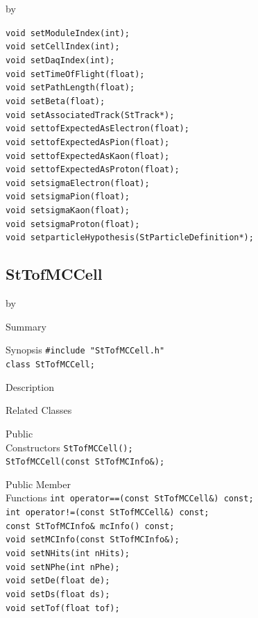 \documentclass[twoside]{article}
\newcommand{\entrylabel}[1]{\mbox{\textbf{{#1}}}\hfil}%
\newenvironment{entry}
{\begin{list}{}%
    {\renewcommand{\makelabel}{\entrylabel}%
     \setlength{\labelwidth}{90pt}%
     \setlength{\leftmargin}{\labelwidth}
     \advance\leftmargin by \labelsep%
      }%
    }%
  {\end{list}}
\newcommand{\Entrylabel}[1]%
{\raisebox{0pt}[1ex][0pt]{\makebox[\labelwidth][l]%
    {\parbox[t]{\labelwidth}{\hspace{0pt}\textbf{{#1}}}}}}
\newenvironment{Entry}%
{\renewcommand{\entrylabel}{\Entrylabel}\begin{entry}}%
  {\end{entry}}
\begin{document}
\begin{Entry}
    \verb+void setModuleIndex(int);+\\
    \verb+void setCellIndex(int);+\\
    \verb+void setDaqIndex(int);+\\
    \verb+void setTimeOfFlight(float);+\\
    \verb+void setPathLength(float);+\\
    \verb+void setBeta(float);+\\
    \verb+void setAssociatedTrack(StTrack*);+\\
    \verb+void settofExpectedAsElectron(float);+\\
    \verb+void settofExpectedAsPion(float);+\\
    \verb+void settofExpectedAsKaon(float);+\\
    \verb+void settofExpectedAsProton(float);+\\
    \verb+void setsigmaElectron(float);+\\
    \verb+void setsigmaPion(float);+\\
    \verb+void setsigmaKaon(float);+\\
    \verb+void setsigmaProton(float);+\\
    \verb+void setparticleHypothesis(StParticleDefinition*);+\\
\end{Entry}
\clearpage

\subsection{StTofMCCell}
\label{sec:StTofMCCell}
\begin{Entry}
\item[Summary]
\item[Synopsis]
    \verb+#include "StTofMCCell.h"+\\
    \verb+class StTofMCCell;+\\
\item[Description]
\item[Related Classes]
\item[Public\\ Constructors]
    \verb+StTofMCCell();+\\
    \verb+StTofMCCell(const StTofMCInfo&);+\\
\item[Public Member\\ Functions]
    \verb+int operator==(const StTofMCCell&) const;+\\
    \verb+int operator!=(const StTofMCCell&) const;+\\
    \verb+const StTofMCInfo& mcInfo() const;+\\
    \verb+void setMCInfo(const StTofMCInfo&);+\\
    \verb+void setNHits(int nHits);+\\
    \verb+void setNPhe(int nPhe);+\\
    \verb+void setDe(float de);+\\
    \verb+void setDs(float ds);+\\
    \verb+void setTof(float tof);+\\
\end{Entry}
\clearpage
\end{document}
